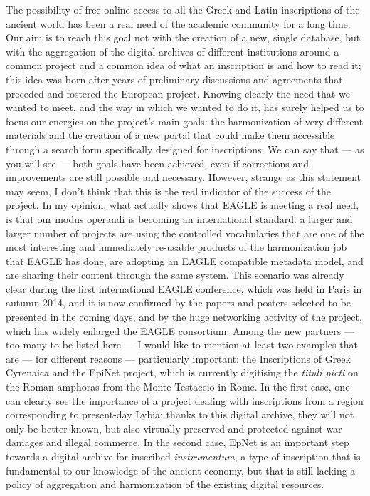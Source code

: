 The possibility of free online access to all the Greek and Latin inscriptions of the ancient world has been a real need of the academic community for a long time. Our aim is to reach this goal not with the creation of a new, single database, but with the aggregation of the digital archives of different institutions around a common project and a common idea of what an inscription is and how to read it; this idea was born after years of preliminary discussions and agreements that preceded and fostered the European project. Knowing clearly the need that we wanted to meet, and the way in which we wanted to do it, has surely helped us to focus our energies on the project’s main goals: the harmonization of very different materials and the creation of a new portal that could make them accessible through a search form specifically designed for inscriptions. We can say that --- as you will see --- both goals have been achieved, even if corrections and improvements are still possible and necessary. However, strange as this statement may seem, I don’t think that this is the real indicator of the success of the project. In my opinion, what actually shows that EAGLE is meeting a real need, is that our modus operandi is becoming an international standard: a larger and larger number of projects are using the controlled vocabularies that are one of the most interesting and immediately re-usable products of the harmonization job that EAGLE has done, are adopting an EAGLE compatible metadata model, and are sharing their content through the same system.
This scenario was already clear during the first international EAGLE conference, which was held in Paris in autumn 2014, and it is now confirmed by the papers and posters selected to be presented in the coming days, and by the huge networking activity of the project, which has widely enlarged the EAGLE consortium. Among the new partners --- too many to be listed here --- I would like to mention at least two examples that are --- for different reasons --- particularly important: the Inscriptions of Greek Cyrenaica and the EpiNet project, which is currently digitising the \emph{tituli picti} on the Roman amphoras from the Monte Testaccio in Rome. In the first case, one can clearly see the importance of a project dealing with inscriptions from a region corresponding to present-day Lybia: thanks to this digital archive, they will not only be better known, but also virtually preserved and protected against war damages and illegal commerce. In the second case, EpNet is an important step towards a digital archive for inscribed \emph{instrumentum}, a type of inscription that is fundamental to our knowledge of the ancient economy, but that is still lacking a policy of aggregation and harmonization of the existing digital resources.
